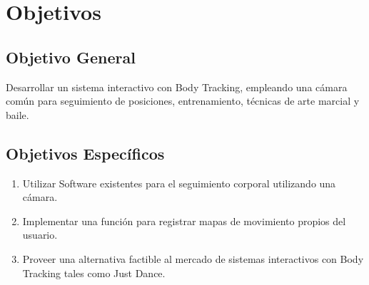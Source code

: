 \chapter{Objetivos}

\section{Objetivo General}

Desarrollar un sistema interactivo con Body Tracking, empleando una cámara común para seguimiento de posiciones, entrenamiento, técnicas de arte marcial y baile.
\section{Objetivos Específicos}

\begin{enumerate}
	\item Utilizar Software existentes para el seguimiento corporal utilizando una cámara.
	\item Implementar una función para registrar mapas de movimiento propios del usuario.
	\item Proveer una alternativa factible al mercado de sistemas interactivos con Body Tracking tales como Just Dance.
\end{enumerate}
